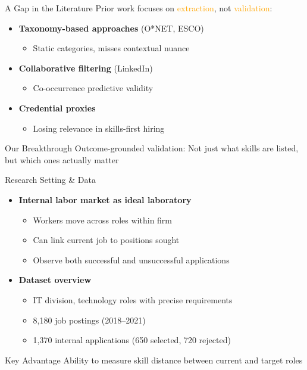 \documentclass{beamer}
\begin{document}
\begin{frame}{A Gap in the Literature}
Prior work focuses on \textcolor{orange}{extraction}, not \textcolor{orange}{validation}:
\begin{itemize}
    \item \textbf{Taxonomy-based approaches} (O*NET, ESCO)
    \begin{itemize}
        \item Static categories, misses contextual nuance
    \end{itemize}
    \item \textbf{Collaborative filtering} (LinkedIn)
    \begin{itemize}
        \item Co-occurrence predictive validity
    \end{itemize}
    \item \textbf{Credential proxies}
    \begin{itemize}
        \item Losing relevance in skills-first hiring
    \end{itemize}
\end{itemize}

\begin{block}{Our Breakthrough}
Outcome-grounded validation: Not just what skills are listed, but which ones actually matter
\end{block}
\end{frame}

\begin{frame}{Research Setting \& Data}
\begin{itemize}
    \item \textbf{Internal labor market as ideal laboratory}
    \begin{itemize}
        \item Workers move across roles within firm
        \item Can link current job to positions sought
        \item Observe both successful and unsuccessful applications
    \end{itemize}
    \item \textbf{Dataset overview}
    \begin{itemize}
        \item IT division, technology roles with precise requirements
        \item 8,180 job postings (2018--2021)
        \item 1,370 internal applications (650 selected, 720 rejected)
    \end{itemize}
\end{itemize}

\begin{block}{Key Advantage}
Ability to measure skill distance between current and target roles
\end{block}
\end{frame}
\end{document}
